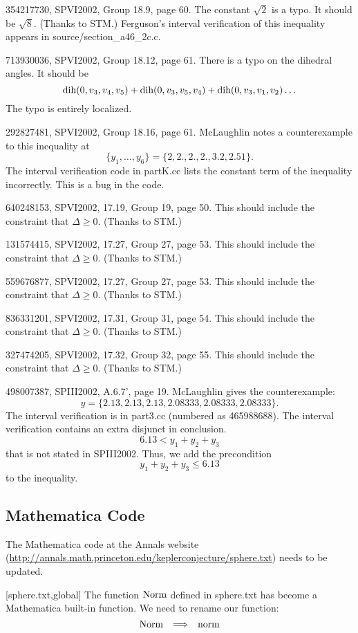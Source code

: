 \documentclass[11pt]{amsart}
\def\op#1{{\text{#1}}}
\def\to{{\quad\Longrightarrow\quad}}
\def\text{\hbox}
\begin{document}
354217730, SPVI2002, Group 18.9, page 60.
The constant $\sqrt2$ is a typo.  It should be $\sqrt8$.  (Thanks to STM.)
Ferguson's interval verification of this inequality appears
in source/section\_a46\_2c.c.

713930036, SPVI2002, Group 18.12, page 61.
There is a typo on the dihedral angles.  It should be
  $$
  \op{dih}(0,v_3,v_4,v_5)+\op{dih}(0,v_3,v_5,v_4)+\op{dih}(0,v_3,v_1,v_2)
  \ldots
  $$
The typo is entirely localized.

292827481, SPVI2002, Group 18.16, page 61.
McLaughlin notes a counterexample to this inequality at
$$
\{y_1,\ldots,y_6\} = \{2, 2., 2., 2., 3.2, 2.51\}.
$$
The interval verification code in partK.cc lists the constant term of
the inequality incorrectly.  This is a bug in the code.

640248153, SPVI2002, 17.19, Group 19, page 50.
This should include the constraint that $\Delta\ge0$. (Thanks to STM.)

131574415, SPVI2002, 17.27, Group 27, page 53.
This should include the constraint that $\Delta\ge0$. (Thanks to STM.)

559676877,  SPVI2002, 17.27, Group 27, page 53.
This should include the constraint that $\Delta\ge0$. (Thanks to STM.)

836331201, SPVI2002, 17.31, Group 31, page 54.
This should include the constraint that $\Delta\ge0$. (Thanks to STM.)

327474205, SPVI2002, 17.32, Group 32, page 55.
This should include the constraint that $\Delta\ge0$. (Thanks to STM.)

498007387, SPIII2002, A.6.7', page 19.
McLaughlin gives the counterexample:
$$
 y = \{2.13,2.13,2.13,2.08333,2.08333,2.08333\}.
$$
The interval verification is in part3.cc (numbered as 465988688).
The interval verification contains an extra disjunct in conclusion.
$$6.13 < y_1 +  y_2 + y_3$$
that is not stated in SPIII2002. 
Thus, we add the precondition
$$y_1 + y_2 + y_3 \le 6.13$$
to the inequality.


\subsection{Mathematica Code}

The Mathematica code at the Annals website
(\url{http://annals.math.princeton.edu/keplerconjecture/sphere.txt}) needs to be updated.

[sphere.txt,global]
The function $\op{Norm}$ defined in sphere.txt
has become a Mathematica built-in function.
We need to rename our function: 
	$$\op{Norm} \to \op{norm}$$
	
\end{document}
